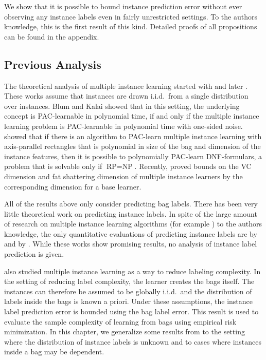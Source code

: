 We show that it is possible to bound instance prediction error without
ever observing any instance labels even in fairly unrestricted settings.
To the authors knowledge, this is the first result of this kind.
%
Detailed proofs of all propositions can be found in the appendix.

\subsection{Previous Analysis}
The theoretical analysis of multiple instance learning started with
\citet{auer1997approximating} and later \citet{blum1998note}.  These works
assume that instances are drawn i.i.d.\ from a single distribution over
instances. Blum and Kalai showed that in this setting, the underlying concept
is PAC-learnable in polynomial time, if and only if the multiple instance
learning problem is PAC-learnable in polynomial time with one-sided noise.
\citet{auer1997approximating} showed that if there is an algorithm to PAC-learn
multiple instance learning with axis-parallel rectangles that is polynomial in
size of the bag and dimension of the instance features, then it is possible to
polynomially PAC-learn DNF-formulars, a problem that is solvable only if
$\text{RP}=\text{NP}$.
Recently, \citet{sabato2009homogeneous,DBLP:journals/corr/abs-1107-2021} proved
bounds on the VC dimension and fat shattering dimension of multiple instance
learners by the corresponding dimension for a base learner.

All of the results above only consider predicting bag labels. There has been
very little theoretical work on predicting instance labels. In spite of the
large amount of research on multiple instance learning algorithms (for example
\citet{andrews2003support,gaertner2002multi,zhou2009multi,li2009convex,zhang2002dd,%
mangasarian2008multiple,leistner2010miforests,chen2006miles})
to the authors knowledge, the only quantitative evaluations of predicting
instance labels are by \citet{gehler2007deterministic} and by
\citet{liconvex2010}. While these works show promising results, no analysis of
instance label prediction is given.

\citet{sabato2010reducing} also studied multiple instance learning as a way to
reduce labeling complexity.  In the setting of reducing label complexity, the
learner creates the bags itself. The instances can therefore be assumed to be
globally i.i.d.\ and the distribution of labels inside the bags is known a
priori.
Under these assumptions, the instance label prediction error is bounded using
the bag label error.  This result is used to evaluate the sample complexity of
learning from bags using empirical risk minimization.  In this chapter, we
generalize some results from \citet{sabato2010reducing} to the setting where
the distribution of instance labels is unknown and to cases where instances
inside a bag may be dependent.

